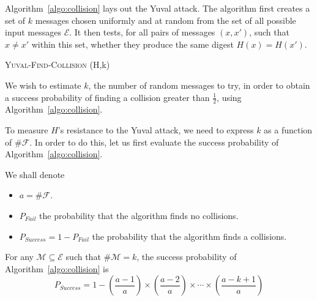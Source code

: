 Algorithm~\ref{algo:collision} lays out the Yuval attack. The algorithm first creates a set of $k$ messages chosen uniformly and at random from the set of all possible input messages  $\mathcal{E} $. It then tests, for all pairs of messages $(x,x')$, such that $x\ne x'$ within this set, whether they produce the same digest $H(x)=H(x')$.
\begin{algorithm}[H]
\caption{\textsc{Yuval-Find-Collision} (H,k)}
\label{algo:collision}
\begin{algorithmic}[1]
  \EndFor{}
  \Else{}
  \EndIf{}
 \end{algorithmic}
\end{algorithm}

We wish to estimate $k$, the number of random messages to try, in order to obtain a success probability of finding a collision greater than $\frac{1}{2}$, using Algorithm~\ref{algo:collision}.

To measure $H$'s resistance to the Yuval attack, we need to express $k$ as a function of $\#  \mathcal{F} $. In order to do this, let us first evaluate the success probability of Algorithm~\ref{algo:collision}.

We shall denote
\begin{itemize}
  \item $a = \#  \mathcal{F} $.
  \item $P_{Fail}$ the probability that the algorithm finds no collisions.
  \item $P_{Success}=1-P_{Fail}$ the probability that the algorithm finds a collisions.
\end{itemize}

\begin{thm}\label{th:2}
  For any $\mathcal{M}  \subseteq  \mathcal{E}$ such that $\# \mathcal{M} =k$, the success probability of Algorithm~\ref{algo:collision} is $$P_{Success}=1- (\frac{a - 1}{a}) \times (\frac{a - 2}{a}) \times \cdots \times (\frac{a - k + 1}{a}) $$
\end{thm}

